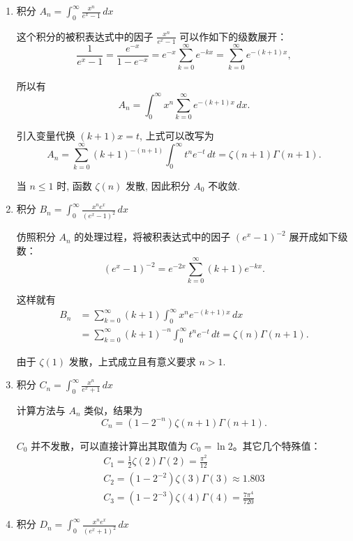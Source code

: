 \begin{defn}
    \noindent
    \begin{enumerate}
        \item 积分 \( A_n = \int_0^\infty \frac{x^n}{e^x - 1} \, dx \)
        
        这个积分的被积表达式中的因子 \(\frac{x^n}{e^x - 1}\) 可以作如下的级数展开：        
        \[
        \frac{1}{e^x - 1} = \frac{e^{-x}}{1 - e^{-x}} = e^{-x} \sum_{k=0}^\infty e^{-kx} = \sum_{k=0}^\infty e^{-(k+1)x},
        \]
        
        所以有        
        \[
        A_n = \int_0^\infty x^n \sum_{k=0}^\infty e^{-(k+1)x} \, dx.
        \]
        
        引入变量代换 \((k+1)x = t\), 上式可以改写为        
        \[
        A_n = \sum_{k=0}^\infty (k+1)^{-(n+1)} \int_0^\infty t^n e^{-t} \, dt = \zeta(n+1)\Gamma(n+1).
        \]
        
        当 \( n \leq 1 \) 时, 函数 \(\zeta(n)\) 发散, 因此积分 \( A_0 \) 不收敛.
        
        \item 积分 \( B_n = \int_0^\infty \frac{x^n e^x}{(e^x - 1)^2} \, dx \)
        
        仿照积分 \( A_n \) 的处理过程，将被积表达式中的因子 \((e^x - 1)^{-2}\) 展开成如下级数：
        \[
        (e^x - 1)^{-2} = e^{-2x} \sum_{k=0}^\infty (k+1)e^{-kx}.
        \]
        
        这样就有
\begin{align*}
            B_n &= \sum_{k=0}^\infty (k+1) \int_0^\infty x^n e^{-(k+1)x} \, dx
     \\
            &= \sum_{k=0}^\infty (k+1)^{-n} \int_0^\infty t^n e^{-t} \, dt = \zeta(n)\Gamma(n+1).
\end{align*} 

        由于 \(\zeta(1)\) 发散，上式成立且有意义要求 \( n > 1 \).
        
        \item 积分 \( C_n = \int_0^\infty \frac{x^n}{e^x + 1} \, dx \)
        
        计算方法与 \( A_n \) 类似，结果为        
        \[
        C_n = (1 - 2^{-n}) \zeta (n + 1) \Gamma (n + 1).
        \]
        \begin{zhu}
        \( C_0 \) 并不发散，可以直接计算出其取值为 \( C_0 = \ln 2 \)。其它几个特殊值：
\begin{gather*}
    C_1 = \frac{1}{2} \zeta (2) \Gamma (2) = \frac{\pi^2}{12}
    \\
    C_2 = (1 - 2^{-2}) \zeta (3) \Gamma (3) \approx 1.803
    \\
    C_3 = (1 - 2^{-3}) \zeta (4) \Gamma (4) = \frac{7\pi^4}{720}
\end{gather*}
        \end{zhu}
    \item 积分 \( D_n = \int_0^\infty \frac{x^n e^x}{(e^x + 1)^2} \, dx \)


\end{enumerate}
\end{defn}
